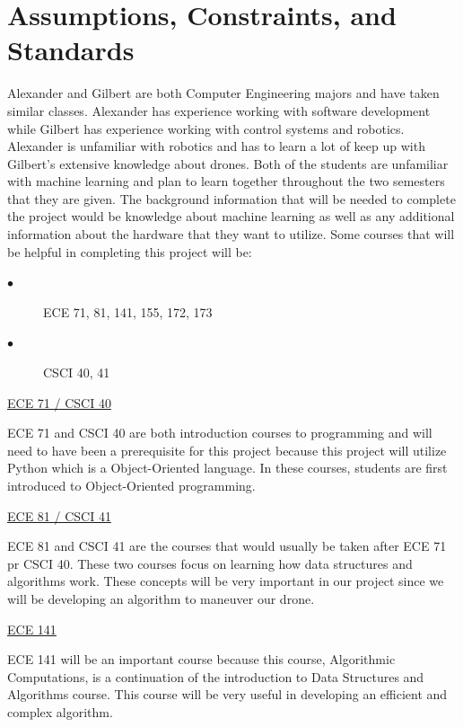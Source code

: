 \documentclass[12pt,onecolumn]{IEEEtran}			%
\begin{document}
 
\section{Assumptions, Constraints, and Standards}
Alexander and Gilbert are both Computer Engineering majors and have taken similar classes. Alexander has experience working with software development while Gilbert has experience working with control systems and robotics. Alexander is unfamiliar with robotics and has to learn a lot of keep up with Gilbert's extensive knowledge about drones. Both of the students are unfamiliar with machine learning and plan to learn together throughout the two semesters that they are given. 
The background information that will be needed to complete the project would be knowledge about machine learning as well as any additional information about the hardware that they want to utilize. Some courses that will be helpful in completing this project will be: 

 \begin{description}
  \item[$\bullet$ ] ECE 71, 81, 141, 155, 172, 173
  \item[$\bullet$ ] CSCI 40, 41
\end{description}
\vspace{12pt} 

\underline{ECE 71 / CSCI 40}
\vspace{6pt} 

ECE 71 and CSCI 40 are both introduction courses to programming and will need to have been a prerequisite for this project because this project will utilize Python which is a Object-Oriented language. In these courses, students are first introduced to Object-Oriented programming.

\vspace{6pt}

\underline{ECE 81 / CSCI 41}
\vspace{6pt}

ECE 81 and CSCI 41 are the courses that would usually be taken after ECE 71 pr CSCI 40. These two courses focus on learning how data structures and algorithms work. These concepts will be very important in our project since we will be developing an algorithm to maneuver our drone. 
\vspace{6pt} 

\underline{ECE 141}
\vspace{6pt} 

ECE 141 will be an important course because this course, Algorithmic Computations, is a continuation of the introduction to Data Structures and Algorithms course. This course will be very useful in developing an efficient and complex algorithm. 
\end{document}
